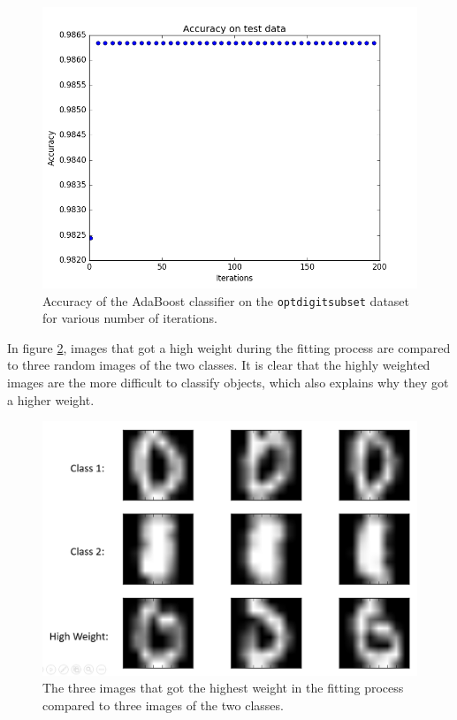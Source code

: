 \documentclass [a4paper] {report}
\begin{document}
	\begin{figure}[H]
		\begin{center}
			\includegraphics[scale=0.5]{Images/accuracy.png}
			\caption{Accuracy of the AdaBoost classifier on the \texttt{optdigitsubset} dataset for various number of iterations.}
			\label{accuracy}
		\end{center}
	\end{figure}
	\newpage \noindent
	In figure \ref{high_weight}, images that got a high weight during the fitting process are compared to three random images of the two classes. It is clear that the highly weighted images are the more difficult to classify objects, which also explains why they got a higher weight.
	
	\begin{figure}[H]
		\includegraphics[width = \textwidth]{Images/images1.png}
		\caption{The three images that got the highest weight in the fitting process compared to three images of the two classes.}
		\label{high_weight}
	\end{figure}
\end{document}
